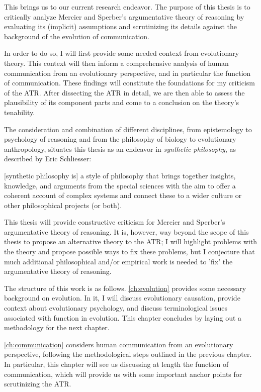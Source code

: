 
This brings us to our current research endeavor.
The purpose of this thesis is to critically analyze Mercier and Sperber's argumentative theory of reasoning by evaluating its (implicit) assumptions and scrutinizing its details against the background of the evolution of communication.

In order to do so, I will first provide some needed context from evolutionary theory. This context will then inform a comprehensive analysis of human communication from an evolutionary perspective, and in particular the function of communication. These findings will constitute the foundations for my criticism of the ATR.
After dissecting the ATR in detail, we are then able to assess the plausibility of its component parts and come to a conclusion on the theory's tenability.

The consideration and combination of different disciplines, from epistemology to psychology of reasoning and from the philosophy of biology to evolutionary anthropology,
situates this thesis as an endeavor in \emph{synthetic philosophy}, as described by Eric Schliesser:
\begin{quoting}
    {[synthetic philosophy is]} a style of philosophy that brings together insights, knowledge, and arguments from the special sciences with the aim to offer a coherent account of complex systems and connect these to a wider culture or other philosophical projects (or both).
    \hfill \citep[pp.~1--2]{Schliesser19}
\end{quoting}

This thesis will provide constructive criticism for Mercier and Sperber's argumentative theory of reasoning. It is, however, way beyond the scope of this thesis to propose an alternative theory to the ATR; I will highlight problems with the theory and propose possible ways to fix these problems, but I conjecture that much additional philosophical and/or empirical work is needed to 'fix' the argumentative theory of reasoning.


The structure of this work is as follows.
\cref{ch:evolution} provides some necessary background on evolution. In it, I will discuss evolutionary causation, provide context about evolutionary psychology, and discuss terminological issues associated with function in evolution. This chapter concludes by laying out a methodology for the next chapter.

\cref{ch:communication} considers human communication from an evolutionary perspective, following the methodological steps outlined in the previous chapter. In particular, this chapter will see us discussing at length the function of communication, which will provide us with some important anchor points for scrutinizing the ATR.

